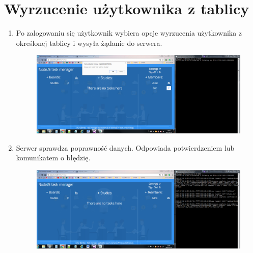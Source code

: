 \documentclass[12pt]{report}
\begin{document}
\section{Wyrzucenie użytkownika z tablicy}
\begin{enumerate}
\item Po zalogowaniu się użytkownik wybiera opcje wyrzucenia użytkownika z określonej tablicy i wysyła żądanie do serwera.
\begin{figure}[!hb]
\centering
\includegraphics[width=\textwidth,height=\textheight,keepaspectratio]{91.png}
\end{figure}
\item Serwer sprawdza poprawność danych. Odpowiada potwierdzeniem lub komunikatem o błędzię.
\begin{figure}[!hb]
\centering
\includegraphics[width=\textwidth,height=\textheight,keepaspectratio]{92.png}
\end{figure}
\end{enumerate}
\end{document}
